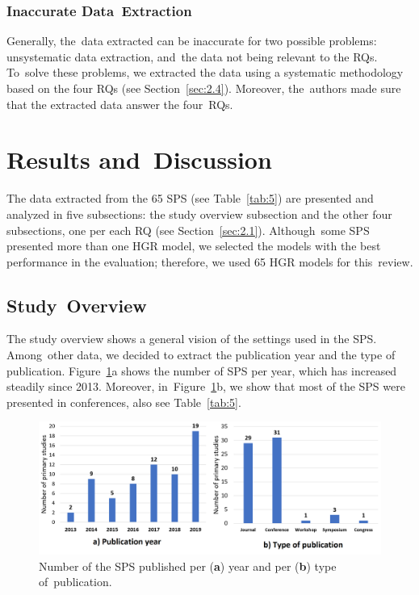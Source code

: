 \documentclass[sensors,review,accept,moreauthors,pdftex]{Definitions/mdpi}
\begin{document}
\subsubsection{Inaccurate Data~Extraction}
Generally, the~data extracted can be inaccurate for two possible problems: unsystematic data extraction, and~the data not being relevant to the RQs. To~solve these problems, we extracted the data using a systematic methodology based on the four RQs (see Section~\ref{sec:2.4}). Moreover, the~authors made sure that the extracted data answer the four~RQs.





\section{Results and~Discussion} \label{result}

The data extracted from the 65 SPS (see Table~\ref{tab:5}) are presented and analyzed in five subsections: the study overview subsection and the other four subsections, one per each RQ (see Section~\ref{sec:2.1}). Although~some SPS presented more than one HGR model, we selected the models with the best performance in the evaluation; therefore, we used 65 HGR models for this~review.

\subsection{Study~Overview}
The study overview shows a general vision of the settings used in the SPS. Among~other data, we decided to extract the publication year and the type of publication. Figure~\ref{fig:2}a shows the number of SPS per year, which has increased steadily since 2013. Moreover, in~Figure~\ref{fig:2}b, we show that most of the SPS were presented in conferences, also see Table~\ref{tab:5}.




\begin{figure}[H]
	\centering
	\includegraphics[width=\linewidth]{PublicationYear}
	\caption{Number of the SPS published per (\textbf{a}) year and per (\textbf{b}) type of~publication.}
	\label{fig:2}

\end{figure}
\unskip
\end{document}
